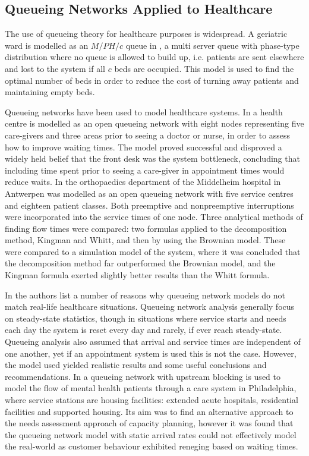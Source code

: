 \documentclass{article}
\begin{document}
\subsection{Queueing Networks Applied to Healthcare}
The use of queueing theory for healthcare purposes is widespread.
A geriatric ward is modelled as an $M/PH/c$ queue in \cite{gorunescuetal02}, a multi server queue with phase-type distribution where no queue is allowed to build up, i.e. patients are sent elsewhere and lost to the system if all $c$ beds are occupied.
This model is used to find the optimal number of beds in order to reduce the cost of turning away patients and maintaining empty beds.

Queueing networks have been used to model healthcare systems.
In \cite{albinetal90} a health centre is modelled as an open queueing network with eight nodes representing five care-givers and three areas prior to seeing a doctor or nurse, in order to assess how to improve waiting times.
The model proved successful and disproved a widely held belief that the front desk was the system bottleneck, concluding that including time spent prior to seeing a care-giver in appointment times would reduce waits.
In \cite{creemerslambrecht07} the orthopaedics department of the Middelheim hospital in Antwerpen was modelled as an open queueing network with five service centres and eighteen patient classes.
Both preemptive and nonpreemptive interruptions were incorporated into the service times of one node.
Three analytical methods of finding flow times were compared: two formulas applied to the decomposition method, Kingman and Whitt, and then by using the Brownian model.
These were compared to a simulation model of the system, where it was concluded that the decomposition method far outperformed the Brownian model, and the Kingman formula exerted slightly better results than the Whitt formula.

In \cite{albinetal90} the authors list a number of reasons why queueing network models do not match real-life healthcare situations.
Queueing network analysis generally focus on steady-state statistics, though in situations where service starts and needs each day the system is reset every day and rarely, if ever reach steady-state.
Queueing analysis also assumed that arrival and service times are independent of one another, yet if an appointment system is used this is not the case.
However, the model used yielded realistic results and some useful conclusions and recommendations.
In \cite{koizumietal05} a queueing network with upstream blocking is used to model the flow of mental health patients through a care system in Philadelphia, where service stations are housing facilities: extended acute hospitals, residential facilities and supported housing.
Its aim was to find an alternative approach to the needs assessment approach of capacity planning, however it was found that the queueing network model with static arrival rates could not effectively model the real-world as customer behaviour exhibited reneging based on waiting times.
\end{document}
